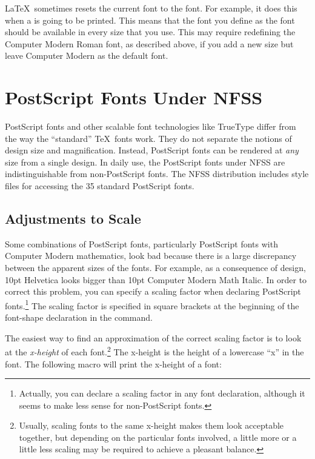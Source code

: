 \LaTeX\ sometimes resets the current
font to the  font.  For example, it does this when a
 is going to be printed.  This means that the font you define as
the  font should be available in every size that you use.
This may require redefining the Computer Modern Roman font, as described
above, if you add a new size but leave Computer Modern as the default font.

\section{PostScript Fonts Under NFSS}

PostScript fonts
and other scalable font technologies like TrueType
differ from the way the ``standard'' \TeX\ fonts work.  They do not separate 
the notions of design size and magnification.  Instead, PostScript fonts 
can be rendered at \emph{any} size from a single design.  
In daily use, the PostScript fonts under NFSS are indistinguishable from
non-PostScript fonts. 
The NFSS distribution includes style files for accessing the 35 standard
PostScript fonts.

\subsection{Adjustments to Scale}

Some 
combinations of PostScript fonts, particularly PostScript fonts
with Computer Modern mathematics, look bad because there is a large
discrepancy between the apparent sizes of the fonts.  For example, as a consequence
of design, 10pt Helvetica looks bigger than 10pt
Computer Modern Math Italic.  In order to correct this problem, 
you can specify a scaling factor when declaring PostScript 
fonts.\footnote{Actually, you can declare a scaling factor in any font
declaration, although it seems to make less sense for non-PostScript
fonts.}
The scaling factor is specified in square brackets at the beginning of
the font-shape declaration in the  command.

\newpage
The easiest way to find an approximation of the correct scaling factor is to
look at the \emph{x-height} of each font.\footnote{Usually, scaling fonts to
the same x-height makes them look acceptable together, but depending
on the particular fonts involved, a little more or a little less scaling may be
required to achieve a pleasant balance.}  The x-height is the
height of a lowercase ``x'' in the font.  
The following macro will print the x-height of a font:

